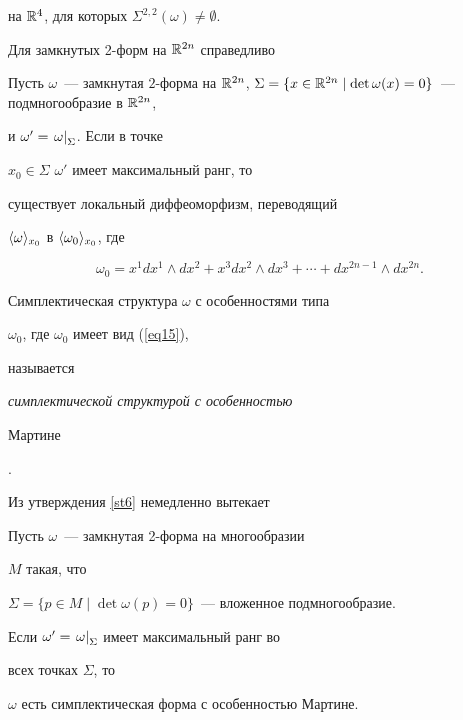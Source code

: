 на ${\Bbb R}^4$, для которых $\Sigma^{2,2}(\omega) \ne \emptyset$.





Для замкнутых 2-форм на ${\Bbb R}^{2n}$ справедливо





\begin{stat}


\label{st6}


Пусть $\omega$~--- замкнутая $2$-форма на $\R^{2n}$, $\Sigma =


\{x \in \R^{2n} \mid \det\omega(x)=0\}$~--- подмногообразие в $\R^{2n}$,


и $\omega' = \left. \omega \right|_{\Sigma}$. Если в точке


$x_0 \in \Sigma$ $\omega'$ имеет максимальный ранг, то


существует локальный диффеоморфизм, переводящий


$\langle \omega \rangle_{x_0}$ в $\langle \omega_0 \rangle_{x_0}$, где


\begin{equation}\label{eq15}


\omega_0 = x^1 dx^1 \wedge dx^2 + x^3 dx^2 \wedge dx^3 + \dotsb+


dx^{2n-1} \wedge dx^{2n}.


\end{equation}


\end{stat}





\begin{defn}


Симплектическая структура $\omega$ с особенностями типа


$\omega_0$, где $\omega_0$ имеет вид  (\ref{eq15}),


называется {\em симплектической структурой с особенностью


Мартине}.


\end{defn}





Из утверждения \ref{st6} немедленно вытекает





\begin{cor} \label{st7}


Пусть $\omega$~--- замкнутая 2-форма на многообразии


$M$ такая, что


$\Sigma =


\{p \in M \mid \det\omega(p)=0\}$~--- вложенное  подмногообразие.


Если $\omega' = \left. \omega \right|_{\Sigma}$ имеет максимальный ранг во


всех точках $\Sigma$, то


$\omega$ есть симплектическая форма с особенностью Мартине.


\end{cor}





